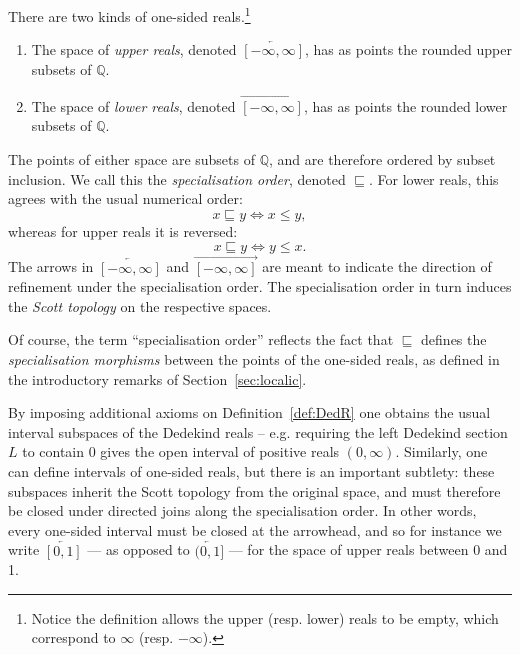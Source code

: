 \documentclass[a4paper, 11pt,reqno]{amsart}
\newcommand{\Q}{\mathbb{Q}}
\begin{document}
\begin{definition}\label{def:one-sided} There are two kinds of one-sided reals.\footnote{Notice the definition allows the upper (resp. lower) reals to be empty, which correspond to $\infty$ (resp. $-\infty$).}
	\begin{enumerate}[label=(\roman*)]
		\item The space of \emph{upper reals}, denoted $\overleftarrow{[-\infty,\infty]}$, has as points the rounded upper subsets of $\Q$.
		\item The space of \emph{lower reals}, denoted $\overrightarrow{[-\infty,\infty]}$, has as points the rounded lower subsets of $\Q$.
	\end{enumerate}
The points of either space are subsets of $\Q$, and are therefore ordered by subset inclusion. We call this the {\em specialisation order}, denoted $\sqsubseteq$. For lower reals, this agrees with the usual numerical order: 
$$x\sqsubseteq y\iff x\leq y,$$
whereas for upper reals it is reversed: 
$$x\sqsubseteq y \iff y\leq x.$$
The arrows in $\overleftarrow{[-\infty,\infty]}$ and $\overrightarrow{[-\infty,\infty]}$ are meant to indicate the direction of refinement under the specialisation order. The specialisation order in turn induces the {\em Scott topology} on the respective spaces.	
\end{definition}

\begin{remark} Of course, the term ``specialisation order'' reflects the fact that $\sqsubseteq$ defines the {\em specialisation morphisms} between the points of the one-sided reals, as defined in the introductory remarks of Section~\ref{sec:localic}.
\end{remark}

By imposing additional axioms on Definition~\ref{def:DedR} one obtains the usual interval subspaces of the Dedekind reals -- e.g. requiring the left Dedekind section $L$ to contain 0 gives the open interval of positive reals $(0,\infty)$. Similarly, one can define intervals of one-sided reals, but there is an important subtlety: these subspaces inherit the Scott topology from the original space, and must therefore be closed under directed joins along the specialisation order. In other words, every one-sided interval must be closed at the arrowhead, and so for instance we write $\overleftarrow{[0,1]}$ --- as opposed to $\overleftarrow{(0,1]}$ --- for the space of upper reals between 0 and 1.
\end{document}
